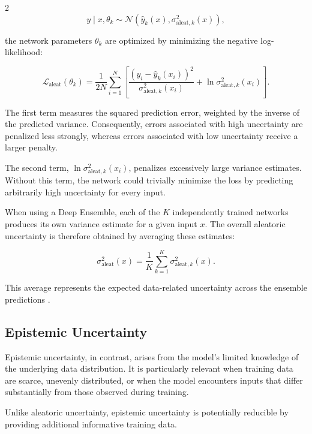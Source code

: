 \documentclass[10pt]{article}
\begin{document}
\begin{multicols}{2}
\begin{equation}
y \mid x,\theta_k \sim
\mathcal{N}\left(
\hat{y}_k(x),
\sigma^2_{\text{aleat},k}(x)
\right),
\end{equation}

the network parameters \(\theta_k\) are optimized by minimizing the negative log-likelihood:

\begin{equation}
\mathcal{L}_{\text{aleat}}(\theta_k)
=
\frac{1}{2N}
\sum_{i=1}^{N}
\left[
\frac{(y_i-\hat{y}_k(x_i))^2}
{\sigma^2_{\text{aleat},k}(x_i)}
+
\ln \sigma^2_{\text{aleat},k}(x_i)
\right].
\end{equation}

The first term measures the squared prediction error, weighted by the inverse of the predicted variance. 
Consequently, errors associated with high uncertainty are penalized less strongly, 
whereas errors associated with low uncertainty receive a larger penalty.

The second term, \(\ln \sigma^2_{\text{aleat},k}(x_i)\), penalizes excessively large variance estimates. 
Without this term, the network could trivially minimize the loss by predicting arbitrarily high uncertainty for every input.

When using a Deep Ensemble, each of the \(K\) independently trained networks produces its own variance estimate for a given input \(x\). 
The overall aleatoric uncertainty is therefore obtained by averaging these estimates:

\begin{equation}
\sigma^2_{\text{aleat}}(x)
=
\frac{1}{K}
\sum_{k=1}^{K}
\sigma^2_{\text{aleat},k}(x).
\end{equation}

This average represents the expected data-related uncertainty across the ensemble predictions \cite{kendall2017uncertainties}.

\subsection{Epistemic Uncertainty}
Epistemic uncertainty, 
in contrast, 
arises from the model's limited knowledge of the underlying data distribution. 
It is particularly relevant when training data are scarce, 
unevenly distributed, 
or when the model encounters inputs that differ substantially from those observed during training.

Unlike aleatoric uncertainty, 
epistemic uncertainty is potentially reducible by providing additional informative training data.


\end{multicols}
\end{document}
